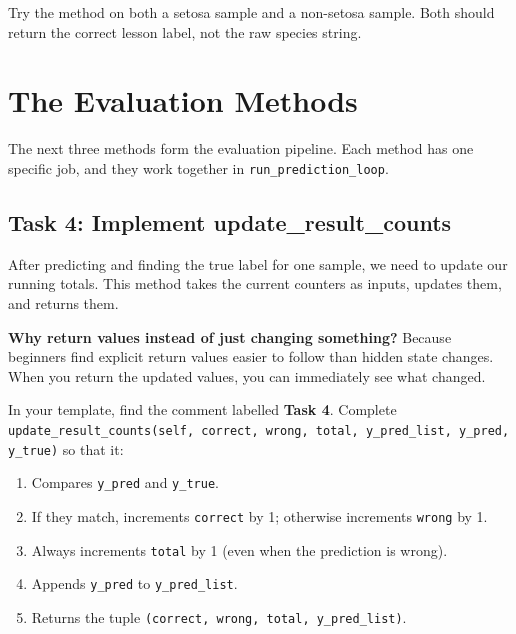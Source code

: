 \begin{tcolorbox}[title=Checkpoint]
Try the method on both a setosa sample and a non-setosa sample.
Both should return the correct lesson label, not the raw species string.
\end{tcolorbox}

\section{The Evaluation Methods}

The next three methods form the evaluation pipeline.
Each method has one specific job, and they work together in \texttt{run\_prediction\_loop}.

\subsection{Task 4: Implement update\_result\_counts}

\begin{tcolorbox}[title=Task 4: Implement update\_result\_counts]
After predicting and finding the true label for one sample, we need to update our running totals.
This method takes the current counters as inputs, updates them, and returns them.

\medskip
\noindent
\textbf{Why return values instead of just changing something?}
Because beginners find explicit return values easier to follow than hidden state changes.
When you return the updated values, you can immediately see what changed.

\medskip
\noindent
In your template, find the comment labelled \textbf{Task 4}.
Complete \texttt{update\_result\_counts(self, correct, wrong, total, y\_pred\_list, y\_pred, y\_true)} so that it:
\begin{enumerate}
    \item Compares \texttt{y\_pred} and \texttt{y\_true}.
    \item If they match, increments \texttt{correct} by 1; otherwise increments \texttt{wrong} by 1.
    \item Always increments \texttt{total} by 1 (even when the prediction is wrong).
    \item Appends \texttt{y\_pred} to \texttt{y\_pred\_list}.
    \item Returns the tuple \texttt{(correct, wrong, total, y\_pred\_list)}.
\end{enumerate}
\end{tcolorbox}

